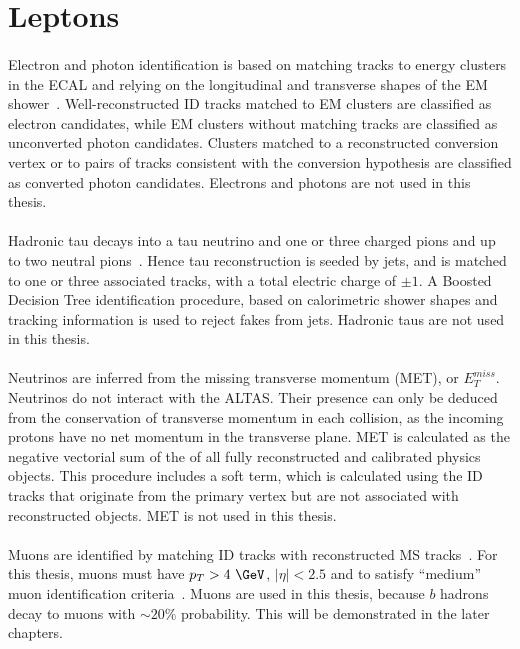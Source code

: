 \section{Leptons}
\paragraph{}
Electron and photon identification is based on matching tracks to energy clusters in the ECAL and relying on the longitudinal and transverse shapes of the EM shower~\cite{ATLAS-CONF-2016-024}. Well-reconstructed ID tracks matched to EM clusters are classified as electron candidates, while EM clusters without matching tracks are classified as unconverted photon candidates. Clusters matched to a reconstructed conversion vertex or to pairs of tracks consistent with the conversion hypothesis are classified as converted photon candidates. Electrons and photons are not used in this thesis.

\paragraph{}
Hadronic tau decays into a tau neutrino and one or three charged pions and up to two neutral pions~\cite{ATLAS-CONF-2017-029}. Hence tau reconstruction is seeded by jets, and  is matched to one or three associated tracks, with a total electric charge of $\pm 1$. A Boosted Decision Tree identification procedure, based on calorimetric shower shapes and tracking information is used to reject fakes from jets. Hadronic taus are not used in this thesis.

\paragraph{}
Neutrinos are inferred from the missing transverse momentum (MET), or $E_T^{miss}$. Neutrinos do not interact with the ALTAS. Their presence can only be deduced from the conservation of transverse momentum in each collision, as the incoming protons have no net momentum in the transverse plane. MET is calculated as the negative vectorial sum of the \pt of all fully reconstructed and calibrated physics objects. This procedure includes a soft term, which is calculated using the ID tracks that originate from the primary vertex but are not associated with reconstructed objects. MET is not used in this thesis.

\paragraph{}
Muons are identified by matching ID tracks with reconstructed MS tracks~\cite{Aad:2016jkr}. For this thesis, muons must have $p_T > 4~\GeV$, $|\eta| < 2.5$ and to satisfy ``medium'' muon identification criteria~\cite{Aad:2016jkr}. Muons are used in this thesis, because $b$ hadrons decay to muons with $\sim 20\%$ probability. This will be demonstrated in the later chapters.


